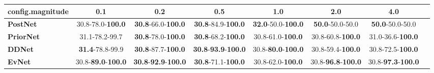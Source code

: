 \begin{tabular}{lccccccc}
\toprule
\textbf{config.magnitude} &                                0.1 &                                         0.2 &                                         0.5 &                                1.0 &                                2.0 &                                4.0 \\
\midrule
\textbf{PostNet } &           30.8-78.0-\textbf{100.0} &           \textbf{30.8}-66.0-\textbf{100.0} &           \textbf{30.8}-84.9-\textbf{100.0} &  \textbf{32.0}-50.0-\textbf{100.0} &            \textbf{50.0}-50.0-50.0 &            \textbf{50.0}-50.0-50.0 \\
\textbf{PriorNet} &                     31.1-78.2-99.7 &           \textbf{30.8}-78.0-\textbf{100.0} &           \textbf{30.8}-68.2-\textbf{100.0} &           30.8-61.0-\textbf{100.0} &           30.8-60.8-\textbf{100.0} &           31.0-36.6-\textbf{100.0} \\
\textbf{DDNet   } &            \textbf{31.4}-78.8-99.9 &           \textbf{30.8}-87.7-\textbf{100.0} &  \textbf{30.8}-\textbf{93.9}-\textbf{100.0} &  30.8-\textbf{80.0}-\textbf{100.0} &           30.8-59.4-\textbf{100.0} &           30.8-72.5-\textbf{100.0} \\
\textbf{EvNet   } &  30.8-\textbf{89.0}-\textbf{100.0} &  \textbf{30.8}-\textbf{92.9}-\textbf{100.0} &           \textbf{30.8}-71.1-\textbf{100.0} &           30.8-62.0-\textbf{100.0} &  30.8-\textbf{96.8}-\textbf{100.0} &  30.8-\textbf{97.3}-\textbf{100.0} \\
\bottomrule
\end{tabular}
